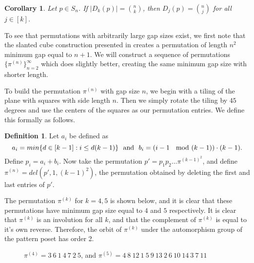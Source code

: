 \documentclass[11pt]{article}
\theoremstyle{plain}
\newtheorem{cor}[thm]{Corollary}
\theoremstyle{definition}
\newtheorem{defn}[thm]{Definition}
\newcommand{\s}{\hspace{.5pc}}
\begin{document}
  \begin{cor} \label{easy} 
  Let $p\in S_n$. If $|D_k(p)|= \binom{n}{k}$, then $D_j(p) = \binom{n}{j}$ for
  all $j \in [k]$.  
  \end{cor}

  To see that permutations with arbitrarily large gap sizes exist, we first note
  that the slanted cube construction presented in \cite{albert} creates a
  permutation of length $n^2$ minimum gap equal to $n+1$. We will construct a
  sequence of permutations $\{\pi^{(n)}\}_{n=2}^\infty$ which does slightly better,
  creating the same minimum gap size with shorter length. 

  To build the permutation $\pi^{(n)}$ with gap size $n$, we begin with a tiling of
  the plane with squares with side length $n$. Then we simply rotate the tiling by
  $45$ degrees and use the centers of the squares as our permutation entries. We
  define this formally as follows.

  \begin{defn} 
  Let $a_i$ be defined as 
  $$a_i = min\{d \in [k-1] : i \leq d(k-1) \} \text{ \  and  \ } b_i = (i-1 \s
  \text{ mod } (k-1)) \cdot (k-1).$$ 
  Define $p_i = a_i+b_i$. Now take the
  permutation $p'=p_1 p_2 \ldots \pi^{(k-1)^2}$, and define $\pi^{(n)} =
  del(p',1,(k-1)^2)$, the permutation obtained by deleting the first and last
  entries of $p'$.
  \end{defn}

  The permutation $\pi^{(k)}$ for $k=4,5$ is shown below, and it is clear that these
  permutations have minimum gap size equal to $4$ and $5$ respectively. It is
  clear that $\pi^{(k)}$ is an involution for all $k$, and that the complement of
  $\pi^{(k)}$ is equal to it's own reverse. Therefore, the orbit of $\pi^{(k)}$ under
  the automorphism group of the pattern poset has order 2.

  \begin{figure}[ht] 
  \centering
   \hspace{4pc}
   \caption{$\pi^{(4)} = 3 \ 6 \ 1 \ 4 \ 7 \ 2 \ 5$, and $\pi^{(5)} = 4 \ 8 \ 12 \ 1 \
   5 \ 9 \ 13 \ 2 \ 6 \ 10 \ 14 \ 3 \ 7 \ 11$} \label{fig:slant}
   \end{figure}
\end{document}
